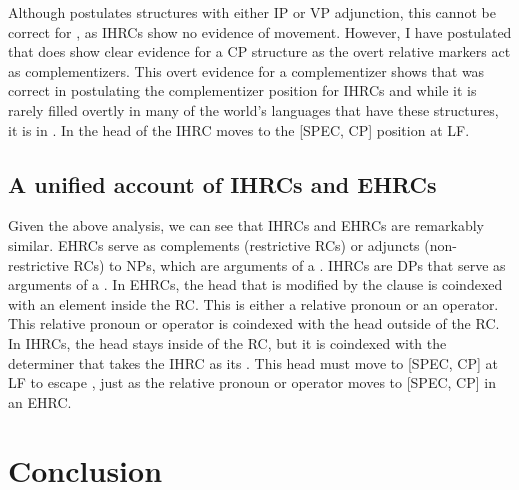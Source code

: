\documentclass[output=paper]{LSP/langsci}
\begin{document}
Although \citet{Basilico1996} postulates structures with either IP or VP adjunction, this cannot be correct for , as IHRCs show no evidence of movement. However, I have postulated that  does show clear evidence for a CP structure as the overt relative markers act as complementizers. This overt evidence for a complementizer shows that \citet{Culy1990} was correct in postulating the complementizer position for IHRCs and while it is rarely filled overtly in many of the world's languages that have these structures, it is in . In  the head of the IHRC moves to the [SPEC, CP] position at LF.

\subsection{A unified account of IHRCs and EHRCs}\label{sec:boyle:6.5}

Given the above analysis, we can see that IHRCs and EHRCs are remarkably similar. EHRCs serve as complements (restrictive RCs) or adjuncts (non-restrictive RCs) to NPs, which are arguments of a . IHRCs are DPs that serve as arguments of a . In EHRCs, the head that is modified by the clause is coindexed with an element inside the RC. This is either a relative pronoun or an operator. This relative pronoun or operator is coindexed with the head outside of the RC. In IHRCs, the head stays inside of the RC, but it is coindexed with the determiner that takes the IHRC as its . This head must move to [SPEC, CP] at LF to escape , just as the relative pronoun or operator moves to [SPEC, CP] in an EHRC.

\section{Conclusion}\label{sec:boyle:7}
\end{document}
